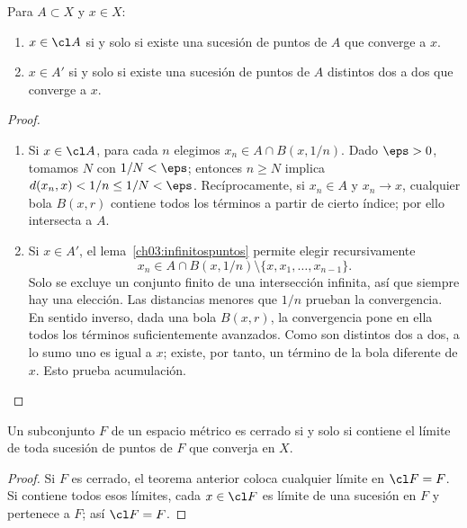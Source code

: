 \begin{teorema}\label{ch03:secuencial}
Para $A\subset X$ y $x\in X$:
\begin{enumerate}[label=(\roman*)]
\item $x\in\cl A$ si y solo si existe una sucesión de puntos de $A$ que converge a $x$.
\item $x\in A'$ si y solo si existe una sucesión de puntos de $A$ distintos dos a dos que converge a $x$.
\end{enumerate}
\end{teorema}
\begin{proof}
\begin{enumerate}[label=(\roman*)]
\item Si $x\in\cl A$, para cada $n$ elegimos $x_n\in A\cap B(x,1/n)$. Dado $\eps>0$, tomamos $N$ con $1/N<\eps$; entonces $n\ge N$ implica $d(x_n,x)<1/n\le1/N<\eps$. Recíprocamente, si $x_n\in A$ y $x_n\to x$, cualquier bola $B(x,r)$ contiene todos los términos a partir de cierto índice; por ello intersecta a $A$.
\item Si $x\in A'$, el lema~\ref{ch03:infinitospuntos} permite elegir recursivamente
\[
x_n\in A\cap B(x,1/n)\setminus\{x,x_1,\ldots,x_{n-1}\}.
\]
Solo se excluye un conjunto finito de una intersección infinita, así que siempre hay una elección. Las distancias menores que $1/n$ prueban la convergencia. En sentido inverso, dada una bola $B(x,r)$, la convergencia pone en ella todos los términos suficientemente avanzados. Como son distintos dos a dos, a lo sumo uno es igual a $x$; existe, por tanto, un término de la bola diferente de $x$. Esto prueba acumulación.
\end{enumerate}
\end{proof}
\begin{corolario}\label{ch03:cerradosecuencial}
Un subconjunto $F$ de un espacio métrico es cerrado si y solo si contiene el límite de toda sucesión de puntos de $F$ que converja en $X$.
\end{corolario}
\begin{proof}
Si $F$ es cerrado, el teorema anterior coloca cualquier límite en $\cl F=F$. Si contiene todos esos límites, cada $x\in\cl F$ es límite de una sucesión en $F$ y pertenece a $F$; así $\cl F=F$.
\end{proof}

